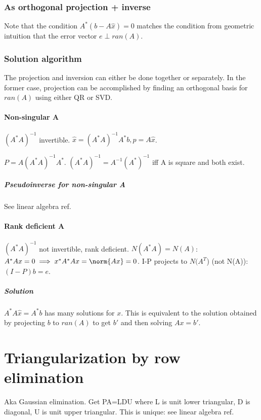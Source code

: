 \documentclass[oneside, article]{memoir}
\begin{document}
\subsection{As orthogonal projection + inverse}
Note that the condition $A^{*}(b-A\hat{x}) = 0$ matches the condition from geometric intuition that the error vector $e \perp ran(A)$.

\subsection{Solution algorithm}
The projection and inversion can either be done together or separately. In the former case, projection can be accomplished by finding an orthogonal basis for $ran(A)$ using either QR or SVD.

\subsubsection{Non-singular A}
$(A^{*}A)^{-1}$ invertible. $\hat{x}=(A^{*}A)^{-1}A^{*}b, p = A\hat{x}$.

$P=A(A^{*}A)^{-1} A^{*}$. $(A^{*}A)^{-1}=A^{-1}(A^{*})^{-1}$ iff A is square and both exist.

\paragraph{Pseudoinverse for non-singular A}
See linear algebra ref.

\subsubsection{Rank deficient A}
$(A^{*}A)^{-1}$ not invertible, rank deficient. \pf $N(A^{*}A) = N(A)$: $A^{*}Ax = 0 \implies x^{*}A^{*}Ax = \norm{Ax} = 0$. I-P projects to $N(A^{T}$) (not N(A)): $(I-P)b=e$.

\paragraph{Solution}
$A^{*}A\hat{x}=A^{*}b$ has many solutions for $x$. This is equivalent to the solution obtained by projecting $b$ to $ran(A)$ to get $b'$ and then solving  $Ax = b'$.

\chapter{Triangularization by row elimination}
Aka Gaussian elimination. Get PA=LDU where L is unit lower triangular, D is diagonal, U is unit upper triangular. This is unique: see linear algebra ref.
\end{document}
